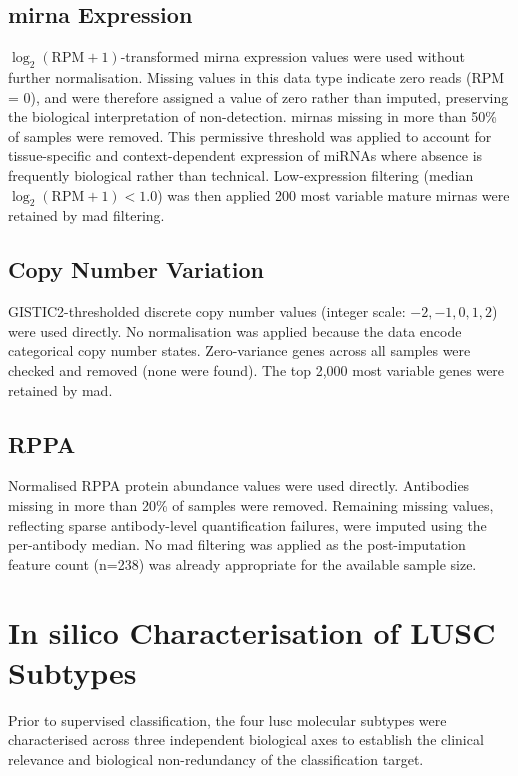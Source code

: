 \subsection{\gls{mirna} Expression}
$\log_2(\mathrm{RPM}+1)$-transformed \gls{mirna} expression values were used without further normalisation. Missing values in this data type indicate zero reads (RPM = 0), and were therefore assigned a value of zero rather than imputed, preserving the biological interpretation of non-detection. \gls{mirna}s missing in more than 50\% of samples were removed. This permissive threshold was applied to account for tissue-specific and context-dependent expression of miRNAs where absence is frequently biological rather than technical. Low-expression filtering (median $\log_2(\mathrm{RPM}+1) < 1.0$) was then applied 200 most variable mature \gls{mirna}s were retained by \gls{mad} filtering.

\subsection{Copy Number Variation}
GISTIC2-thresholded discrete copy number values (integer scale: $-2, -1, 0, 1, 2$) were used directly. No normalisation was applied because the data encode categorical copy number states. Zero-variance genes across all samples were checked and removed (none were found). The top 2,000 most variable genes were retained by \gls{mad}.

\subsection{RPPA}
Normalised RPPA protein abundance values were used directly. Antibodies missing in more than 20\% of samples were removed. Remaining missing values, reflecting sparse antibody-level quantification failures, were imputed using the per-antibody median. No \gls{mad} filtering was applied as the post-imputation feature count (n=238) was already appropriate for the available sample size.

\section{In silico Characterisation of LUSC Subtypes}
\label{sec:in_silico_char_method}

Prior to supervised classification, the four \gls{lusc} molecular subtypes were characterised across three independent biological axes to establish the clinical relevance and biological non-redundancy of the classification target.

